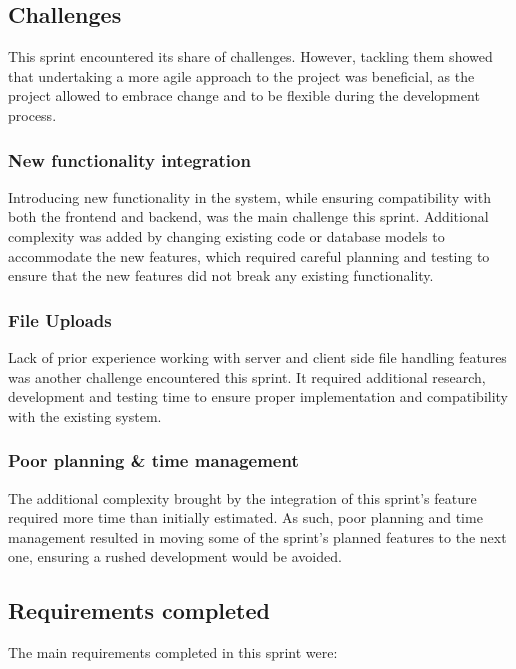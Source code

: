 \subsection{Challenges}

This sprint encountered its share of challenges. However, tackling them showed that undertaking a more agile approach to the project was beneficial, as the project allowed to embrace change and to be flexible during the development process.

\subsubsection{New functionality integration}

Introducing new functionality in the system, while ensuring compatibility with both the frontend and backend, was the main challenge this sprint. Additional complexity was added by changing existing code or database models to accommodate the new features, which required careful planning and testing to ensure that the new features did not break any existing functionality.

\subsubsection{File Uploads}

Lack of prior experience working with server and client side file handling features was another challenge encountered this sprint. It required additional research, development and testing time to ensure proper implementation and compatibility with the existing system.

\subsubsection{Poor planning \& time management}

The additional complexity brought by the integration of this sprint's feature required more time than initially estimated. As such, poor planning and time management resulted in moving some of the sprint's planned features to the next one, ensuring a rushed development would be avoided.

\subsection{Requirements completed}

The main requirements completed in this sprint were:

